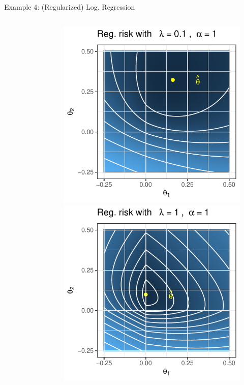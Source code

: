 \documentclass[11pt,compress,t,notes=noshow, xcolor=table]{beamer}
\begin{document}
\begin{vbframe}{Example 4: (Regularized) Log. Regression}
\begin{columns}
\begin{column}{.28\textwidth}
\begin{figure}
\end{figure}
\end{column}
\begin{column}{.28\textwidth}
\begin{figure}
	\includegraphics{figure_man/logreg-1-0.1.pdf}\\
	\includegraphics{figure_man/logreg-1-1.pdf} 
\end{figure}
\end{column}
\end{columns}


\end{vbframe}
\end{document}
